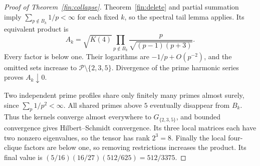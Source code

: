 \begin{proof}[Proof of Theorem~\ref{fin:collapse}]
Theorem~\ref{fin:delete} and partial summation imply
$\sum_{p\notin B_k}1/p<\infty$ for each fixed $k$, so the spectral
tail lemma applies.  Its equivalent product is
\[
 A_k=\sqrt{K(4)}
       \prod_{p\notin B_k}\frac{p}{\sqrt{(p-1)(p+3)}}.
\]
Every factor is below one.  Their logarithms are
$-1/p+O(p^{-2})$, and the omitted sets increase to
$\mathcal P\setminus\{2,3,5\}$.  Divergence of the prime harmonic
series proves $A_k\downarrow0$.

Two independent prime profiles share only finitely many primes almost
surely, since $\sum_p1/p^2<\infty$.  All shared primes above $5$
eventually disappear from $B_k$.  Thus the kernels converge almost
everywhere to $G_{\{2,3,5\}}$, and bounded convergence gives
Hilbert--Schmidt convergence.
Its three local matrices each have two nonzero eigenvalues, so the
tensor has rank $2^3=8$.
Finally the local four-clique factors are below one, so removing
restrictions increases the product.  Its final value is
$(5/16)(16/27)(512/625)=512/3375$.
\end{proof}
